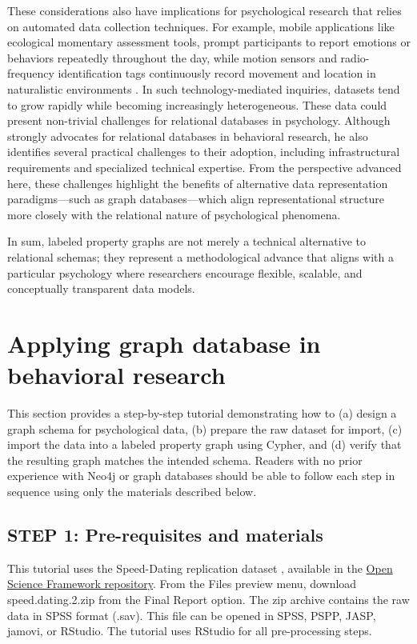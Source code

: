 \documentclass[sn-apa,pdflatex]{sn-jnl}
\theoremstyle{remark}
\theoremstyle{definition}
\begin{document}
These considerations also have implications for psychological research
that relies on automated data collection techniques. For example, mobile
applications like ecological momentary assessment tools, prompt
participants to report emotions or behaviors repeatedly throughout the
day, while motion sensors and radio-frequency identification tags
continuously record movement and location in naturalistic environments
\citep{Bak2021}. In such technology-mediated inquiries, datasets tend to
grow rapidly while becoming increasingly heterogeneous. These data could
present non-trivial challenges for relational databases in psychology.
Although \citet{soto2025} strongly advocates for relational databases in
behavioral research, he also identifies several practical challenges to
their adoption, including infrastructural requirements and specialized
technical expertise. From the perspective advanced here, these
challenges highlight the benefits of alternative data representation
paradigms---such as graph databases---which align representational
structure more closely with the relational nature of psychological
phenomena.

In sum, labeled property graphs are not merely a technical alternative
to relational schemas; they represent a methodological advance that
aligns with a particular psychology where researchers encourage
flexible, scalable, and conceptually transparent data models.

\section{Applying graph database in behavioral
research}\label{applying-graph-database-in-behavioral-research}

This section provides a step-by-step tutorial demonstrating how to (a)
design a graph schema for psychological data, (b) prepare the raw
dataset for import, (c) import the data into a labeled property graph
using Cypher, and (d) verify that the resulting graph matches the
intended schema. Readers with no prior experience with Neo4j or graph
databases should be able to follow each step in sequence using only the
materials described below.

\subsection{STEP 1: Pre-requisites and
materials}\label{step-1-pre-requisites-and-materials}

This tutorial uses the Speed-Dating replication dataset
\citep{Selterman2023}, available in the
\href{https://osf.io/ng6cc/overview}{Open Science Framework repository}.
From the Files preview menu, download speed.dating.2.zip from the Final
Report option. The zip archive contains the raw data in SPSS format
(.sav). This file can be opened in SPSS, PSPP, JASP, jamovi, or RStudio.
The tutorial uses RStudio for all pre-processing steps.
\end{document}
